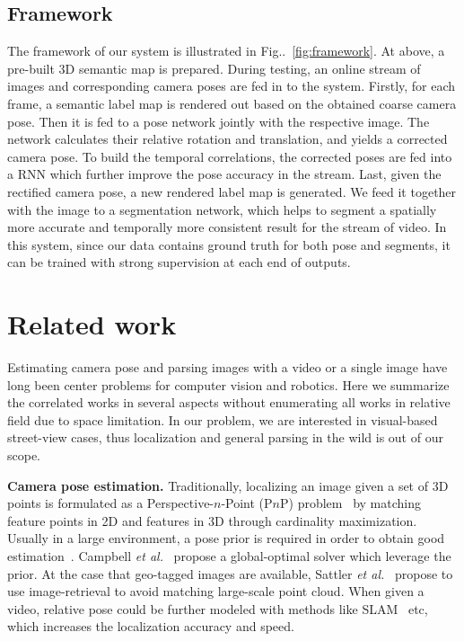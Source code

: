 \documentclass[10pt,twocolumn,letterpaper]{article}
\makeatletter
\newcommand{\figref}[1]{Fig\onedot~\ref{#1}}
\DeclareRobustCommand\onedot{\futurelet\@let@token\@onedot}
\def\onedot{\ifx\@let@token.\else.\null\fi\xspace}
\def\etal{\emph{et al.}}
\makeatother
\begin{document}
\subsection{Framework}
\label{sub:framework}
The framework of our system is illustrated in \figref{fig:framework}. At above, a pre-built 3D semantic map is prepared. During testing, an online stream of images and corresponding camera poses are fed in to the system. Firstly, for each frame, a semantic label map is rendered out based on the obtained coarse camera pose. Then it is fed to a pose network jointly with the respective image.  The network calculates their relative rotation and translation, and yields a corrected camera pose. To build the temporal correlations, the corrected poses are fed into a RNN which further improve the pose accuracy in the stream. 
Last, given the rectified camera pose, a new rendered label map is generated. We feed it together with the image to a segmentation network, which helps to segment a spatially more accurate and temporally more consistent result for the stream of video. 
In this system, since our data contains ground truth for both pose and segments, it can be trained with strong supervision at each end of outputs.

\section{Related work}
\label{sec:related_work}
Estimating camera pose and parsing images with a video or a single image have long been center problems for computer vision and robotics. 
Here we summarize the correlated works in several aspects without enumerating all works in relative field due to space limitation. 
In our problem, we are interested in visual-based street-view cases, thus localization and general parsing in the wild is out of our scope.

\textbf{Camera pose estimation.} Traditionally, localizing an image given a set of 3D points is formulated as a Perspective-$n$-Point (P$n$P) problem~\cite{haralick1994review,kneip2014upnp} by matching feature points in 2D and features in 3D through cardinality maximization. Usually in a large environment, a pose prior is required in order to obtain good estimation~\cite{david2004softposit,moreno2008pose}. Campbell \etal~\cite{campbell2017globally} propose a global-optimal solver which leverage the prior. At the case that geo-tagged images are available, Sattler \etal~\cite{sattler2017large} propose to use image-retrieval to avoid matching large-scale point cloud.
When given a video, relative pose could be further modeled with methods like SLAM~\cite{engel2014lsd} etc, which increases the localization accuracy and speed. 
\end{document}

